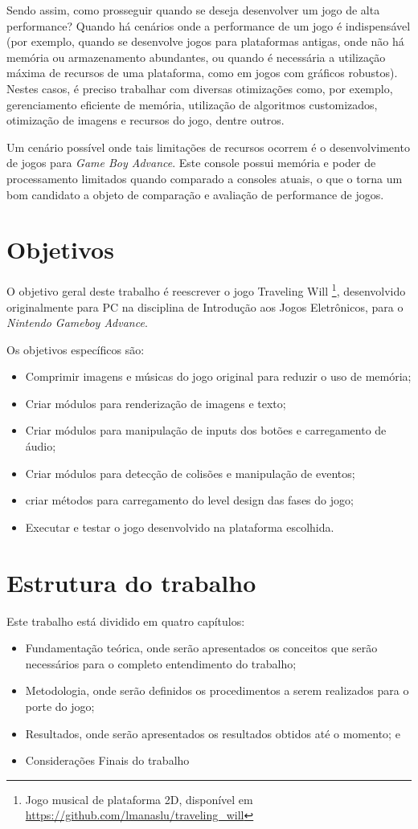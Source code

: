 Sendo assim, como prosseguir quando se deseja desenvolver um jogo de alta performance? Quando há cenários onde a performance de um jogo é indispensável (por exemplo, quando se desenvolve jogos para plataformas antigas, onde não há memória ou armazenamento abundantes, ou quando é necessária a utilização máxima de recursos de uma plataforma, como em jogos com gráficos robustos). Nestes casos, é preciso trabalhar com diversas otimizações como, por exemplo, gerenciamento eficiente de memória, utilização de algoritmos customizados, otimização de imagens e recursos do jogo, dentre outros.

Um cenário possível onde tais limitações de recursos ocorrem é o desenvolvimento de jogos para \textit{Game Boy Advance}. Este console possui memória e poder de processamento limitados quando comparado a consoles atuais, o que o torna um bom candidato a objeto de comparação e avaliação de performance de jogos.

\section*{Objetivos}

O objetivo geral deste trabalho é reescrever o jogo Traveling Will \footnote{Jogo musical de plataforma 2D, disponível em \url{https://github.com/lmanaslu/traveling_will}}, desenvolvido originalmente para PC na disciplina de Introdução aos Jogos Eletrônicos, para o \textit{Nintendo Gameboy Advance}.

Os objetivos específicos são:

\begin{itemize}
\item Comprimir imagens e músicas do jogo original para reduzir o uso de memória;
\item Criar módulos para renderização de imagens e texto;
\item Criar módulos para manipulação de inputs dos botões e carregamento de áudio;
\item Criar módulos para detecção de colisões e manipulação de eventos;
\item criar métodos para carregamento do level design das fases do jogo;
\item Executar e testar o jogo desenvolvido na plataforma escolhida.
\end{itemize}

\section*{Estrutura do trabalho}

Este trabalho está dividido em quatro capítulos:

\begin{itemize}
  \item Fundamentação teórica, onde serão apresentados os conceitos que serão necessários para o completo entendimento do trabalho;
  \item Metodologia, onde serão definidos os procedimentos a serem realizados para o porte do jogo;
  \item Resultados, onde serão apresentados os resultados obtidos até o momento; e
  \item Considerações Finais do trabalho
\end{itemize}